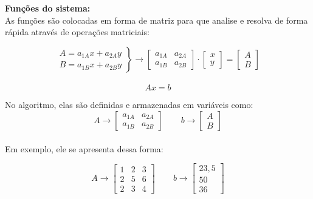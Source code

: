 \documentclass[
12pt,				%
openright,			%
twoside,			%
a4paper,			%
english,			%
french,				%
spanish,			%
brazil				%
]{abntex2_new}
\begin{document}
		\begin{alineas}
			\item{\textbf{Funções do sistema:}\\
				As funções são colocadas em forma de matriz para que
				analise e resolva de forma rápida através de operações
				matriciais:
				
				$$\left.\begin{aligned}
				A=a_{1A} x + a_{2A} y\\
				B=a_{1B} x + a_{2B} y
				\end{aligned}
				\right\} \rightarrow
				\begin{bmatrix}
				a_{1A} & a_{2A} \\
				a_{1B} & a_{2B}
				\end{bmatrix} \cdot
				\begin{bmatrix}
				x \\
				y
				\end{bmatrix}
				= 
				\begin{bmatrix}
				A \\
				B
				\end{bmatrix}
				$$\\
				$$Ax=b$$
				
				No algoritmo, elas são definidas e armazenadas em variáveis como:
				$$	A \rightarrow   \begin{bmatrix}
				a_{1A} & a_{2A} \\
				a_{1B} & a_{2B}
				\end{bmatrix} \hspace{25pt}
				b \rightarrow  \begin{bmatrix}
				A \\
				B
				\end{bmatrix}
				$$\\
				
				Em exemplo, ele se apresenta dessa forma:
				
				$$	A \rightarrow   \begin{bmatrix}
				1 & 2 & 3 \\
				2 & 5 & 6 \\
				2 & 3 & 4
				\end{bmatrix} \hspace{25pt}
				b \rightarrow  \begin{bmatrix}
				23,5 \\
				50 \\
				36
				\end{bmatrix}
				$$\\
				
}
\end{alineas}
\end{document}
